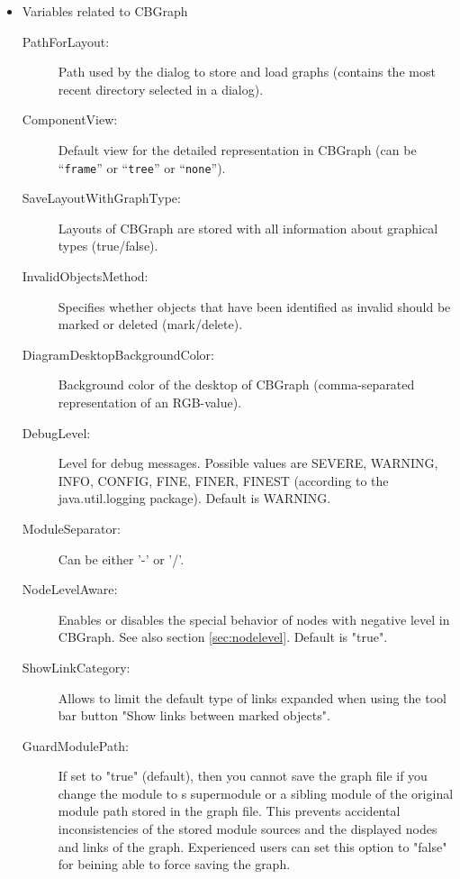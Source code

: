 \begin{itemize}
\item Variables related to CBGraph
\begin{description}
\item[PathForLayout:] Path used by the dialog to store and load graphs (contains the most recent directory selected in a dialog).
\item[ComponentView:] Default view for the detailed representation in CBGraph (can be ``\verb+frame+'' or ``\verb+tree+'' or ``\verb+none+'').
\item[SaveLayoutWithGraphType:] Layouts of CBGraph are stored with all information about graphical types (true/false).
\item[InvalidObjectsMethod:] Specifies whether objects that have been identified as invalid should be marked or deleted (mark/delete).
\item[DiagramDesktopBackgroundColor:] Background color of the desktop of CBGraph (comma-separated representation of an RGB-value).
\item[DebugLevel:] Level for debug messages. Possible values are SEVERE, WARNING, INFO, CONFIG, FINE, FINER, FINEST
(according to the java.util.logging package). Default is WARNING.
\item[ModuleSeparator:] Can be either '-' or '/'. 
\item[NodeLevelAware:] Enables or disables the special behavior of nodes with negative level in CBGraph. See also
section \ref{sec:nodelevel}. Default is "true".
\item[ShowLinkCategory:] Allows to limit the default type of links expanded when using the tool bar button "Show links between marked objects".
\item[GuardModulePath:] If set to "true" (default), then you cannot save the graph file if you change the module to s supermodule or
a sibling module of the original module path stored in the graph file. This prevents accidental inconsistencies of the stored module sources
and the displayed nodes and links of the graph. Experienced users can set this option to "false" for beining able to force saving the graph.
\end{description}
\end{itemize}


